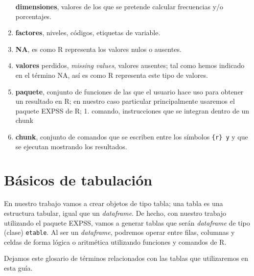 \documentclass[
]{book}
\begin{document}
\begin{enumerate}
  \textbf{dimensiones}, valores de los que se pretende calcular frecuencias y/o porcentajes.
\item
  \textbf{factores}, niveles, códigos, etiquetas de variable.
\item
  \textbf{NA}, es como R representa los valores nulos o ausentes.
\item
  \textbf{valores} perdidos, \emph{missing values}, valores ausentes; tal como hemos indicado en el término NA, así es como R representa este tipo de valores.
\item
  \textbf{paquete}, conjunto de funciones de las que el usuario hace uso para obtener un resultado en R; en nuestro caso particular principalmente usaremos el paquete EXPSS de R; 1. comando, instrucciones que se integran dentro de un chunk
\item
  \textbf{chunk}, conjunto de comandos que se escriben entre los símbolos \texttt{\{r\}\ y} y que se ejecutan mostrando los resultados.
\end{enumerate}

\hypertarget{buxe1sicos-de-tabulaciuxf3n}{%
\section{Básicos de tabulación}\label{buxe1sicos-de-tabulaciuxf3n}}

En nuestro trabajo vamos a crear objetos de tipo tabla; una tabla es una estructura tabular, igual que un \emph{dataframe}. De hecho, con nuestro trabajo utilizando el paquete EXPSS, vamos a generar tablas que serán \emph{dataframe} de tipo (clase) \texttt{etable}. Al ser un \emph{dataframe}, podremos operar entre filas, columnas y celdas de forma lógica o aritmética utilizando funciones y comandos de R.

Dejamos este glosario de términos relacionados con las tablas que utilizaremos en esta guía.
\end{document}
